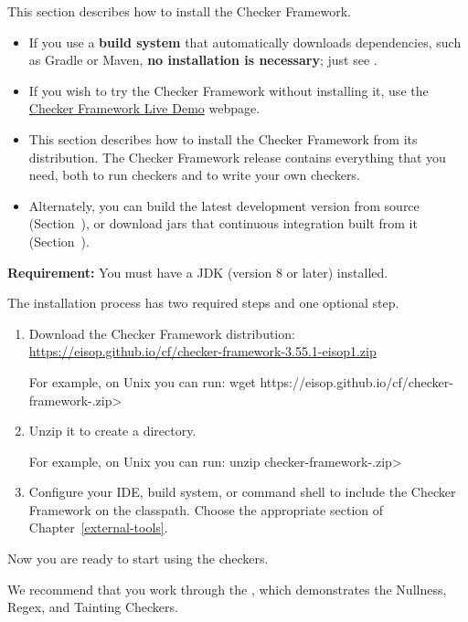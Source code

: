 This section describes how to install the Checker Framework.
\begin{itemize}
\item
If you use a \textbf{build system} that automatically downloads dependencies,
such as Gradle or Maven, \textbf{no installation is necessary}; just see
.
\item
If you wish to try the Checker Framework without installing it, use the
\href{https://eisop.uwaterloo.ca/live/}{Checker Framework Live Demo} webpage.
\item
This section describes how to install the Checker Framework from its
distribution.  The Checker Framework release contains everything that you
need, both to run checkers and to write your own checkers.
\item
Alternately, you can build the latest development version from source
(Section~), or download jars that continuous
integration built from it (Section~).
\end{itemize}


\textbf{Requirement:}
You must have a JDK (version 8 or later) installed.

The installation process has two required steps and one
optional step.
\begin{enumerate}
\item
  Download the Checker Framework distribution:
  \\
  \url{https://eisop.github.io/cf/checker-framework-3.55.1-eisop1.zip}

  For example, on Unix you can run: \<wget https://eisop.github.io/cf/checker-framework-\ReleaseVersion{}.zip>

\item
  Unzip it to create a  directory.

  For example, on Unix you can run: \<unzip checker-framework-\ReleaseVersion{}.zip>

\item
  \label{installation-configure-step}%
  Configure your IDE, build system, or command shell to include the Checker
  Framework on the classpath.  Choose the appropriate section of
  Chapter~\ref{external-tools}.


\end{enumerate}

Now you are ready to start using the checkers.

We recommend that you work through the
, which demonstrates the Nullness, Regex, and Tainting Checkers.

